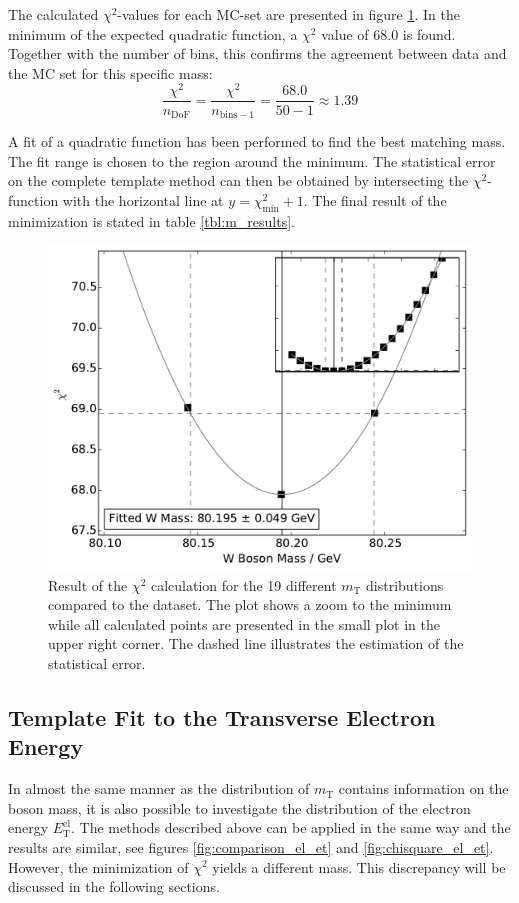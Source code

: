 \documentclass[
	paper=A4,
	parskip=full,
	chapterprefix=true,
	11pt,
	headings=normal,
	bibliography=totoc,
	listof=totoc,
	titlepage=on,
]{scrreprt}
\newcommand{\ELET}{\ensuremath{{E_\mathrm{T}^\mathrm{el}}}\xspace}
\newcommand{\MT}{\ensuremath{{m_\mathrm{T}}}\xspace}
\begin{document}
The calculated $\chi^2$-values for each MC-set are presented in figure \ref{fig:chisquare_m_t}. In the minimum of the expected quadratic function, a $\chi^2 $ value of \num{68.0} is found. Together with the number of bins, this confirms the agreement between data and the MC set for this specific mass:
\begin{equation}
\frac{\chi^2}{n_{\mathrm{DoF}}} = \frac{\chi^2}{n_{\mathrm{bins}-1}} =  \frac{\num{68.0}}{\num{50} - \num{1}} \approx \num{1.39} 
\end{equation}

A fit of a quadratic function has been performed to find the best matching \PW mass. The fit range is chosen to the region around the minimum. The statistical error on the complete template method can then be obtained by intersecting the $\chi^2$-function with the horizontal line at $y=\chi^2_{\mathrm{min}}+1$. The final result of the minimization is stated in table \ref{tbl:m_results}.


\begin{figure}
	\centering
	\includegraphics{chisquare_m_t}
	\caption{Result of the $\chi^2$ calculation for the 19 different \MT distributions compared to the dataset. The plot shows a zoom to the minimum while all calculated points are presented in the small plot in the upper right corner. The dashed line illustrates the estimation of the statistical error.}
	\label{fig:chisquare_m_t}
\end{figure}


\subsection{Template Fit to the Transverse Electron Energy}
In almost the same manner as the distribution of \MT contains information on the \PW boson mass, it is also possible to investigate the distribution of the electron energy \ELET. The methods described above can be applied in the same way and the results are similar, see figures \ref{fig:comparison_el_et} and \ref{fig:chisquare_el_et}. However, the minimization of $\chi^2$ yields a different \PW mass. This discrepancy will be discussed in the following sections.
\end{document}
